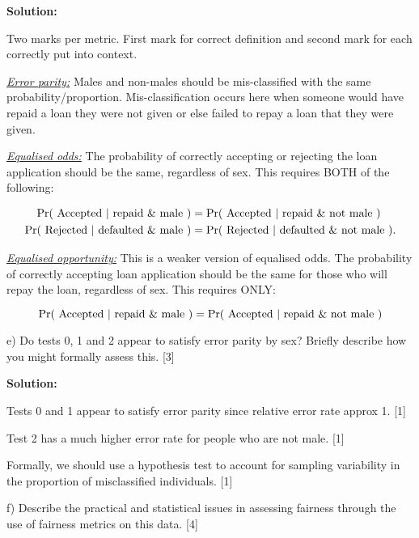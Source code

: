 \documentclass[a4paper, 11pt]{article}
\begin{document}
{\color{blue}
\textbf{Solution:} 

Two marks per metric. First mark for correct definition and second mark for each correctly put into context. 

\uline{\textit{Error parity:}} Males and non-males should be mis-classified with the same probability/proportion. Mis-classification occurs here when someone would have repaid a loan they were not given or else failed to repay a loan that they were given. 

 
\uline{\textit{Equalised odds:}} The probability of correctly accepting or rejecting the loan application should be the same, regardless of sex. This requires BOTH of the following: 

\begin{align*}	
  \Pr(\hbox{ Accepted } | \hbox{ repaid } \& \hbox{ male }) &= \Pr(\hbox{ Accepted } | \hbox{ repaid } \& \hbox{ not male })  \\ 
\Pr(\hbox{ Rejected } | \hbox{ defaulted } \& \hbox{ male }) &= \Pr(\hbox{ Rejected } | \hbox{ defaulted } \& \hbox{ not male }). 
\end{align*}
     

\uline{\textit{Equalised opportunity:}} This is a weaker version of equalised odds. The probability of correctly accepting loan application should be the same for those who will repay the loan, regardless of sex. This requires ONLY: 

$$ \Pr(\hbox{ Accepted } | \hbox{ repaid } \& \hbox{ male }) = \Pr(\hbox{ Accepted } | \hbox{ repaid } \& \hbox{ not male }) $$
}

e) Do tests 0, 1 and 2 appear to satisfy error parity by sex? Briefly describe how you might formally assess this. [3]

{\color{blue}
\textbf{Solution:}

Tests 0 and 1 appear to satisfy error parity since relative error rate approx 1. [1]

Test 2 has a much higher error rate for people who are not male. [1]

Formally, we should use a hypothesis test to account for sampling variability in the proportion of misclassified individuals. [1]
}

f) Describe the practical and statistical issues in assessing fairness through the use of fairness metrics on this data. [4]
\end{document}
